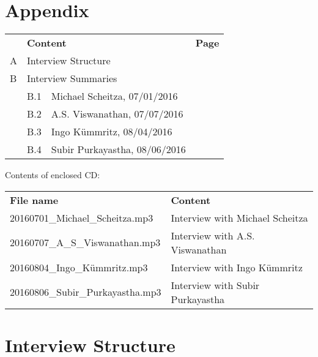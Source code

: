 \begin{appendix}
\section*{Appendix}
\label{Appendix}

\begin{table*}[htb!]
	
	\begin{tabular}{p{1cm} p{1cm} p{11cm} r}
		& \multicolumn{2}{l}{\textbf{Content}} &\textbf{Page}\\
		\rule{0pt}{3ex}A & \multicolumn{2}{l}{Interview Structure}&\pageref{app:InterviewStructure}\\
		\rule{0pt}{3ex}B & \multicolumn{2}{l}{Interview Summaries}&\pageref{int:Scheitza}\\
		\rule{0pt}{3ex}&B.1&Michael Scheitza, 07/01/2016&\pageref{int:Scheitza}\\
		\rule{0pt}{3ex}&B.2&A.S. Viswanathan, 07/07/2016&\pageref{int:Viswanathan}\\
		\rule{0pt}{3ex}&B.3&Ingo K\"ummritz, 08/04/2016&\pageref{int:Ingo}\\
		\rule{0pt}{3ex}&B.4&Subir Purkayastha, 08/06/2016&\pageref{int:Subir}\\
	\end{tabular}
	\vspace{3mm}
\end{table*}

Contents of enclosed CD:

\begin{table*}[htb!]
	\begin{tabular}{l l}
		\textbf{File name} & \textbf{Content}\\
		\rule{0pt}{3ex}20160701\_Michael\_Scheitza.mp3& Interview with Michael Scheitza\\
		\rule{0pt}{3ex}20160707\_A\_S\_Viswanathan.mp3& Interview with A.S. Viswanathan\\
		\rule{0pt}{3ex}20160804\_Ingo\_K\"ummritz.mp3&Interview with Ingo K\"ummritz\\
		\rule{0pt}{3ex}20160806\_Subir\_Purkayastha.mp3&Interview with Subir Purkayastha\\
	\end{tabular}
\end{table*}
\newpage
\tocless\section{Interview Structure}


\end{appendix}
